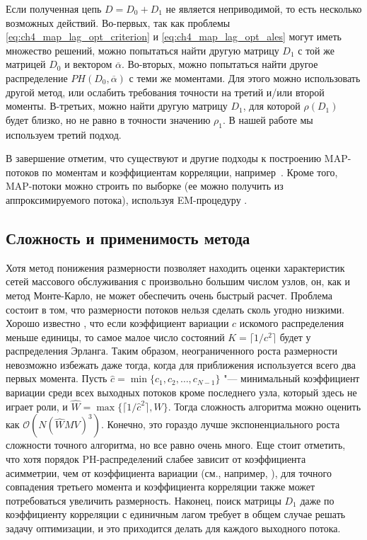 Если полученная цепь $D = D_0 + D_1$ не является неприводимой, то есть несколько возможных действий. Во-первых, так как проблемы \eqref{eq:ch4_map_lag_opt_criterion} и \eqref{eq:ch4_map_lag_opt_ales} могут иметь множество решений, можно попытаться найти другую матрицу $D_1$ с той же матрицей $D_0$ и вектором $\overline{\alpha}$. Во-вторых, можно попытаться найти другое распределение $PH(D_0, \overline{\alpha})$ с теми же моментами. Для этого можно использовать другой метод, или ослабить требования точности на третий и/или второй моменты. В-третьих, можно найти другую матрицу $D_1$, для которой $\rho(D_1)$ будет близко, но не равно в точности значению $\rho_1$. В нашей работе мы используем третий подход.

В завершение отметим, что существуют и другие подходы к построению MAP-потоков по моментам и коэффициентам корреляции, например~\cite{TelekHorvath2007,Bodrog2010}. Кроме того, MAP-потоки можно строить по выборке (ее можно получить из аппроксимируемого потока), используя EM-процедуру \cite{Horvath2013,Ephraim2009,Buchholz2003}.


\subsection{Сложность и применимость метода}\label{sec:ch4_approx_complexity}

Хотя метод понижения размерности позволяет находить оценки характеристик сетей массового обслуживания с произвольно большим числом узлов, он, как и метод Монте-Карло, не может обеспечить очень быстрый расчет. Проблема состоит в том, что размерности потоков нельзя сделать сколь угодно низкими. Хорошо известно \cite{Aldous1987}, что если коэффициент вариации $c$ искомого распределения меньше единицы, то самое малое число состояний $K = \lceil 1 / c^2 \rceil $ будет у распределения Эрланга. Таким образом, неограниченного роста размерности невозможно избежать даже тогда, когда для приближения используется всего два первых момента. Пусть $\hat{c} = \min\{c_1, c_2, \dots, c_{N-1}\}$ "--- минимальный коэффициент вариации среди всех выходных потоков кроме последнего узла, который здесь не играет роли, и $\hat{W} = \max\{\lceil 1 / \hat{c}^2 \rceil, W\}$. Тогда сложность алгоритма можно оценить как $\mathcal{O}(N (\hat{W}MV)^3 )$. Конечно, это гораздо лучше экспоненциального роста сложности точного алгоритма, но все равно очень много. Еще стоит отметить, что хотя порядок PH-распределений слабее зависит от коэффициента асимметрии, чем от коэффициента вариации (см., например, \cite{Johnson1989}), для точного совпадения третьего момента и коэффициента корреляции также может потребоваться увеличить размерность. Наконец, поиск матрицы $D_1$ даже по коэффициенту корреляции с единичным лагом требует в общем случае решать задачу оптимизации, и это приходится делать для каждого выходного потока.





